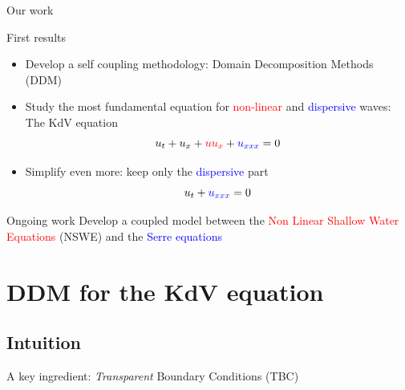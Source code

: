 \documentclass{beamer}
\begin{document}
  \begin{frame}{Our work}
    \begin{block}{First results }
      \begin{itemize}
        \item Develop a self coupling methodology: Domain Decomposition Methods (DDM)
        \pause

        \item Study the most fundamental equation for \textcolor{red}{non-linear} and \textcolor{blue}{dispersive} waves: The KdV equation
        $$ u_t + u_x + \textcolor{red}{uu_x}+ \textcolor{blue}{u_{xxx}} = 0$$
        \pause

        \item Simplify even more: keep only the \textcolor{blue}{dispersive} part
        $$ u_t + \textcolor{blue}{u_{xxx}} = 0$$
      \end{itemize}
    \end{block}

    \pause
    \begin{block}{Ongoing work}
      Develop a coupled model between the  \textcolor{red}{Non Linear Shallow Water Equations} (NSWE) and the \textcolor{blue}{Serre equations}
    \end{block}
  \end{frame}

  \section{DDM for the KdV equation}
  \subsection{Intuition}
    \begin{frame}{A key ingredient: \emph{Transparent} Boundary Conditions (TBC)}

    \end{frame}
\end{document}
